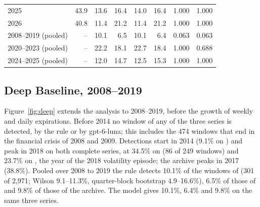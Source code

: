 \begin{table}[H]
\begin{tabular}{@{}lrrrrrrr@{}}
2025 & 43.9 & 13.6 & 16.4 & 14.0 & 16.4 & 1.000 & 1.000 \\
2026 & 40.8 & 11.4 & 21.2 & 11.4 & 21.2 & 1.000 & 1.000 \\
\midrule
2008--2019 (pooled) & -- & 10.1 & 6.5 & 10.1 & 6.4 & 0.063 & 0.063 \\
2020--2023 (pooled) & -- & 22.2 & 18.1 & 22.7 & 18.4 & 1.000 & 0.688 \\
2024--2025 (pooled) & -- & 12.0 & 14.7 & 12.5 & 15.3 & 1.000 & 1.000 \\
\bottomrule
\end{tabular}
\end{table}

\subsection{Deep Baseline, 2008--2019}
\label{sec:results:deep}

Figure~\ref{fig:deep} extends the analysis to 2008--2019, before the growth of weekly and daily expirations.
Before 2014 no window of any of the three series is detected, by the rule or by gpt-6-luna; this includes the 474 windows that end in the financial crisis of 2008 and 2009. Detections start in 2014 (9.1\% on ) and peak in 2018 on both complete series, at 34.5\% on  (86 of 249 windows) and 23.7\% on , the year of the 2018 volatility episode; the archive peaks in 2017 (38.8\%). Pooled over 2008 to 2019 the rule detects 10.1\% of the windows of  (301 of 2{,}971; Wilson 9.1--11.3\%, quarter-block bootstrap 4.9--16.6\%), 6.5\% of those of  and 9.8\% of those of the archive. The model gives 10.1\%, 6.4\% and 9.8\% on the same three series.

